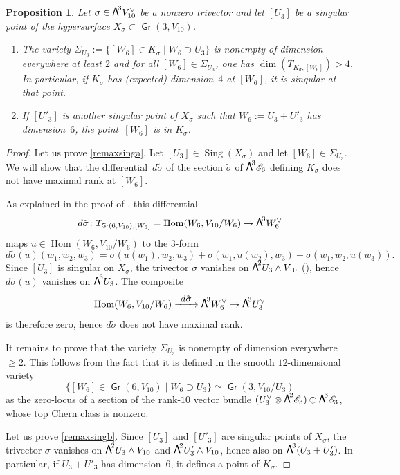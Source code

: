 \documentclass[JEP,XML,SOM,Unicode, NoEqCountersInSection,NoFloatCountersInSection]{cedram}
\let\mathcal\mathscr
\newenvironment{enumeratea}
{\bgroup\def\theenumi{\alph{enumi}}\def\theenumii{\arabic{enumii}}\begin{enumerate}}
{\end{enumerate}\egroup}
\newcommand\To[1]{\mathchoice{\xrightarrow{\textstyle\kern4pt#1\kern3pt}}{\stackrel{#1}{\longrightarrow}}{}{}}
\newtheorem{prop}[lemm]{Proposition}
\theoremstyle{definition}
\newcommand\cE{\mathcal{E}}
\DeclareMathOperator{\Gr}{\mathsf{Gr}}
\let\isom\simeq
\DeclareMathOperator{\Hom}{Hom}
\DeclareMathOperator{\Sing}{Sing}\let\sing\Sing
\newcommand\bw[1]{{\hbox{\large$\mathsf{\Lambda}$}^{\!#1}}}
\begin{document}
\begin{prop} \label{remaxsing}
Let $\sigma\in \bw3V_{10}^\vee$ be a nonzero trivector and let $[U_3]$ be a singular point of the hypersurface $X_\sigma\subset \Gr(3,V_{10})$.
\begin{enumeratea}
\item\label{remaxsinga}
The variety $\Sigma_{U_3}:=\{[W_6]\in K_\sigma\mid W_6 \supset U_3\}$ is nonempty of dimension everywhere at least $ 2$ and for all $[W_6]\in \Sigma_{U_3}$, one has $\dim(T_{K_\sigma, [W_6]})>4$. In particular, if $K_\sigma$ has (expected) dimension~$4$ at $ [W_6]$, it is singular at that point.

\item\label{remaxsingb}
If $[U'_3]$ is another singular point of $X_\sigma$ such that $W_6:=U_3+U'_3$ has dimension~$6$, the point~$ [W_6]$ is in $K_\sigma$.
\end{enumeratea}
\end{prop}

\begin{proof}
Let us prove \eqref{remaxsinga}. Let $[U_3]\in\Sing(X_\sigma)$ and let $[W_6]\in\Sigma_{U_3}$.
We will show that the differential~$d\tilde{\sigma}$ of the section $\tilde{\sigma}$ of $\bw3\cE_6$ defining
$K_\sigma$ does not have maximal rank at $[W_6]$.

As explained in the proof of \cite[Prop.\,3.1]{devo}, this differential
\[
d\tilde{\sigma}\colon T_{\Gr(6,V_{10}),[W_6]}=\Hom(W_6,V_{10}/W_6)\to \bw3W_6^\vee
\]
maps $u\in \Hom(W_6,V_{10}/W_6)$ to the 3-form
\[
d\tilde{\sigma}(u)( w_1, w_2, w_3 )= \sigma(u(w_1), w_2, w_3)+\sigma(w_1, u(w_2), w_3)+ \sigma(w_1, w_2, u(w_3)).
\]
Since $[U_3]$ is singular on $X_\sigma$, the trivector $\sigma$ vanishes on $\bw2U_3\wedge V_{10}$ (\cite[Prop.\,3.1]{devo}), hence~$d\tilde{\sigma}(u)$ vanishes on $\bw3U_3$. The composite
\begin{equation}
\label{eqdiff}
\Hom(W_6,V_{10}/W_6)\To{d\tilde{\sigma}} \bw3W_6^\vee
\to \bw3U_3^\vee
\end{equation}
is therefore zero, hence $d\tilde{\sigma}$ does not have maximal rank.

It remains to prove that the variety $\Sigma_{U_3} $ is nonempty of dimension everywhere $\ge 2$. This follows from the fact that it is defined in the smooth $12$-dimensional variety \[
 \{[W_6]\in \Gr(6,V_{10})\mid W_6 \supset U_3\}\isom \Gr(3, V_{10}/U_3)
\] as the zero-locus of a section of the
rank-$10$ vector bundle $(U_3^\vee\otimes \bw2\cE_3)\oplus \bw3\cE_3$, whose top Chern class is nonzero.

Let us prove \eqref{remaxsingb}. Since $[U_3]$ and $[U'_3]$ are singular points of $X_\sigma$, the trivector $\sigma$ vanishes on $\bw2U_3\wedge V_{10}$ and
$\bw2U'_3\wedge V_{10}$, hence also on $\bw3(U_3+U'_3)$. In particular, if $U_3+U'_3$ has dimension~$6$, it defines a point of $K_\sigma$.
\end{proof}
\end{document}

